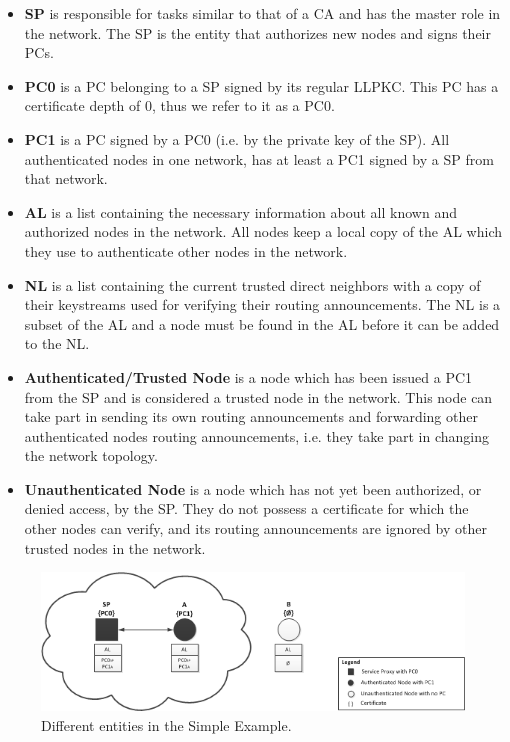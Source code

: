 \begin{itemize}
  \item \textbf{\acf{SP}} is responsible for tasks similar to that of a \ac{CA}
  	and has the master role in the network. The \ac{SP} is the entity that
 	authorizes new nodes and signs their \acp{PC}.
  \item \textbf{\acf{PC0}} is a \ac{PC} belonging to a \ac{SP} signed by its
    regular \ac{LLPKC}. This \ac{PC} has a certificate depth of 0, thus we refer
    to it as a \ac{PC0}.
  \item \textbf{\acf{PC1}} is a \ac{PC} signed by a \ac{PC0} (i.e. by the
    private key of the \ac{SP}). All authenticated nodes in one network, has at
    least a \ac{PC1} signed by a \ac{SP} from that network.
  \item \textbf{\acf{AL}} is a list containing the necessary information about
 	all known and authorized nodes in the network. All nodes keep a local copy of
 	the \ac{AL} which they use to authenticate other nodes in the network.
  \item \textbf{\acf{NL}} is a list containing the current trusted direct
    neighbors with a copy of their keystreams used for verifying their routing
    announcements. The \ac{NL} is a subset of the \ac{AL} and a node must be
    found in the \ac{AL} before it can be added to the \ac{NL}.
  \item \textbf{Authenticated/Trusted Node} is a node which has been issued a
    \ac{PC1} from the \ac{SP} and is considered a trusted node in the network.
    This node can take part in sending its own routing announcements and
    forwarding other authenticated nodes routing announcements, i.e. they take
    part in changing the network topology.
  \item \textbf{Unauthenticated Node} is a node which has not yet been
    authorized, or denied access, by the \ac{SP}. They do not possess a
    certificate for which the other nodes can verify, and its routing
    announcements are ignored by other trusted nodes in the network.
\end{itemize}

\begin{figure}[h]
	\centering
  	\includegraphics[width=\textwidth]{images/simple_example_entities.png}
  	\caption{Different entities in the Simple Example.}
	\label{fig:simple_example_entities}
\end{figure}


